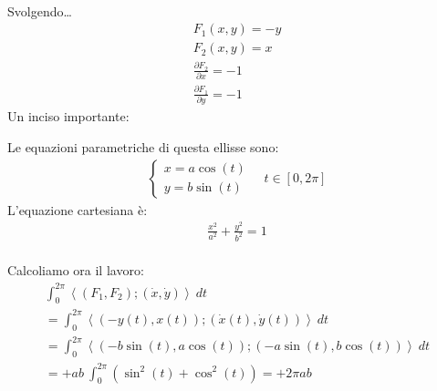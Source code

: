 \documentclass[a4paper, oneside]{article}
\begin{document}
\begin{example}
\begin{gather*}
    \end{gather*}
    Svolgendo\dots
    \begin{gather*}
        F_1(x,y) = -y\\
        F_2(x,y) = x\\
        \frac{\partial F_2}{\partial x} = -1\\
        \frac{\partial F_1}{\partial y} = -1
    \end{gather*}
    Un inciso importante:
        \begin{center}
        \end{center}
        Le equazioni parametriche di questa ellisse sono:
        \begin{gather*}
            \begin{cases}
                x = a \cos(t)\\
                y = b \sin(t)
            \end{cases} \quad t \in [0,2\pi]
        \end{gather*}
        L'equazione cartesiana è:
        \begin{gather*}
            \frac{x^2}{a^2} + \frac{y^2}{b^2} = 1
        \end{gather*}
        \hfil\\
        Calcoliamo ora il lavoro:
        \begin{gather*}
            \int_{0}^{2\pi} \left\langle  (F_1,F_2);(\dot{x},\dot{y}) \right\rangle \ dt\\
            = \int_{0}^{2\pi} \left\langle \left(-y(t), x(t)\right);\left(\dot{x}(t), \dot{y}(t)\right)   \right\rangle \ dt\\
            = \int_{0}^{2\pi} \left\langle \left(-b \sin(t) , a \cos(t)\right);\left(-a \sin(t), b \cos(t)\right)   \right\rangle \ dt\\
            = +ab \ \int_{0}^{2\pi} \left(\sin^2(t) + \cos^2(t)\right) = +2\pi ab     
        \end{gather*}
\end{example}
\end{document}
